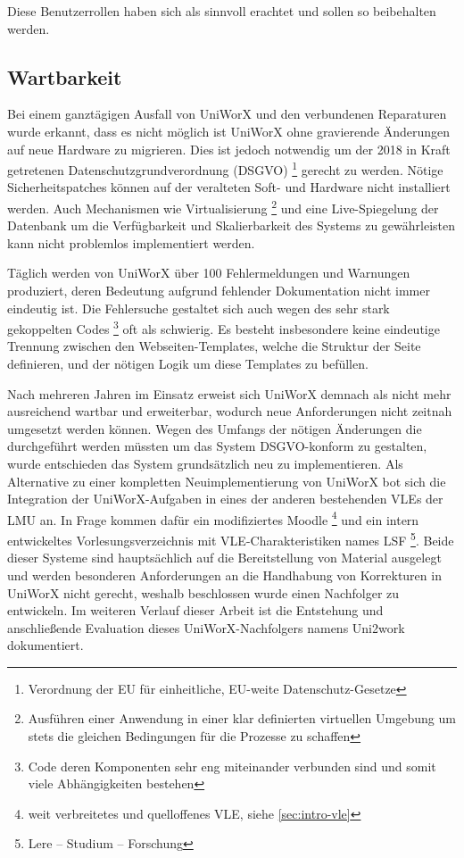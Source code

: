 \documentclass[11pt,a4paper,twoside,ngerman]{article}
\begin{document}
\noindent
Diese Benutzerrollen haben sich als sinnvoll erachtet und sollen so beibehalten werden.

\subsection{Wartbarkeit} \label{sec:uniworx-maintenance}
Bei einem ganztägigen Ausfall von UniWorX und den verbundenen Reparaturen wurde erkannt, dass es nicht möglich ist UniWorX ohne gravierende Änderungen auf neue Hardware zu migrieren. Dies ist jedoch notwendig um der 2018 in Kraft getretenen Datenschutzgrundverordnung (DSGVO) \footnote{Verordnung der EU für einheitliche, EU-weite Datenschutz-Gesetze} gerecht zu werden. Nötige Sicherheitspatches können auf der veralteten Soft- und Hardware nicht installiert werden. Auch Mechanismen wie Virtualisierung \footnote{Ausführen einer Anwendung in einer klar definierten virtuellen Umgebung um stets die gleichen Bedingungen für die Prozesse zu schaffen} und eine Live-Spiegelung der Datenbank um die Verfügbarkeit und Skalierbarkeit des Systems zu gewährleisten kann nicht problemlos implementiert werden.

Täglich werden von UniWorX über 100 Fehlermeldungen und Warnungen produziert, deren Bedeutung aufgrund fehlender Dokumentation nicht immer eindeutig ist.
Die Fehlersuche gestaltet sich auch wegen des sehr stark gekoppelten Codes \footnote{Code deren Komponenten sehr eng miteinander verbunden sind und somit viele Abhängigkeiten bestehen} oft als schwierig. Es besteht insbesondere keine eindeutige Trennung zwischen den Webseiten-Templates, welche die Struktur der Seite definieren, und der nötigen Logik um diese Templates zu befüllen. 

Nach mehreren Jahren im Einsatz erweist sich UniWorX demnach als nicht mehr ausreichend wartbar und erweiterbar, wodurch neue Anforderungen nicht zeitnah umgesetzt werden können. Wegen des Umfangs der nötigen Änderungen die durchgeführt werden müssten um das System DSGVO-konform zu gestalten, wurde entschieden das System grundsätzlich neu zu implementieren. Als Alternative zu einer kompletten Neuimplementierung von UniWorX bot sich die Integration der UniWorX-Aufgaben in eines der anderen bestehenden VLEs der LMU an. In Frage kommen dafür ein modifiziertes Moodle \footnote{weit verbreitetes und quelloffenes VLE, siehe \autoref{sec:intro-vle}} und ein intern entwickeltes Vorlesungsverzeichnis mit VLE-Charakteristiken names LSF \footnote{Lere -- Studium -- Forschung}. Beide dieser Systeme sind hauptsächlich auf die Bereitstellung von Material ausgelegt und werden besonderen Anforderungen an die Handhabung von Korrekturen in UniWorX nicht gerecht, weshalb beschlossen wurde einen Nachfolger zu entwickeln. Im weiteren Verlauf dieser Arbeit ist die Entstehung und anschließende Evaluation dieses UniWorX-Nachfolgers namens Uni2work dokumentiert.
\end{document}
